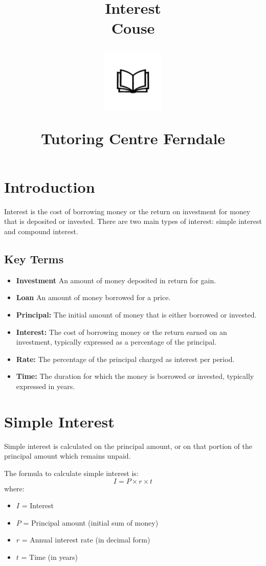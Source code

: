 \documentclass[12pt]{article}
\title{Interest\\Couse\\
\begin{center}
\includegraphics[width=4em]{ApS_logo.png}
\end{center}
\begin{normalsize}Tutoring Centre Ferndale \end{normalsize}}
\author{}
\date{}
\begin{document}
\maketitle

\section*{Introduction}
Interest is the cost of borrowing money or the return on investment for money that is deposited or invested. There are two main types of interest: simple interest and compound interest.

\subsection*{Key Terms}
\begin{itemize}
    \item \textbf{Investment} An amount of money deposited in return for gain.
    \item \textbf{Loan} An amount of money borrowed for a price.
    \item \textbf{Principal:} The initial amount of money that is either borrowed or invested.
    \item \textbf{Interest:} The cost of borrowing money or the return earned on an investment, typically expressed as a percentage of the principal.
    \item \textbf{Rate:} The percentage of the principal charged as interest per period.
    \item \textbf{Time:} The duration for which the money is borrowed or invested, typically expressed in years.
\end{itemize}

\newpage

\section*{Simple Interest}

Simple interest is calculated on the principal amount, or on that portion of the principal amount which remains unpaid.

The formula to calculate simple interest is:
\[
I = P \times r \times t
\]
where:
\begin{itemize}
    \item \(I\) = Interest
    \item \(P\) = Principal amount (initial sum of money)
    \item \(r\) = Annual interest rate (in decimal form)
    \item \(t\) = Time (in years)
\end{itemize}
\end{document}
